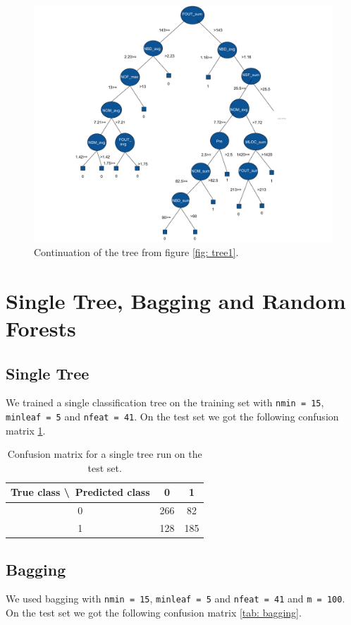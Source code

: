\documentclass[a4paper,11pt]{article}
\begin{document}
\begin{figure}[h!]
\includegraphics[width=\textwidth]{Tree2.pdf}
\caption{Continuation of the tree from figure \ref{fig: tree1}.} 
\label{fig: tree2}
\end{figure}

\section{Single Tree, Bagging and Random Forests}

\subsection{Single Tree}
We trained a single classification tree on the training set with \verb|nmin = 15|, \verb|minleaf = 5| and \verb|nfeat = 41|. On the test set we got the following confusion matrix \ref{tab: singletree}.
 
\begin{table}[h!]
\centering
	\begin{tabular}{c||c|c}
	True class \textbackslash\ Predicted class & 0 & 1 \\ \hline \hline
	0 & 266 & 82 \\ \hline
	1 & 128 & 185
	\end{tabular}
	\caption{Confusion matrix for a single tree run on the test set.}
	\label{tab: singletree}
\end{table}


\subsection{Bagging}
We used bagging with \verb|nmin = 15|, \verb|minleaf = 5| and \verb|nfeat = 41| and \verb|m = 100|. On the test set we got the following confusion matrix \ref{tab: bagging}.
\end{document}
